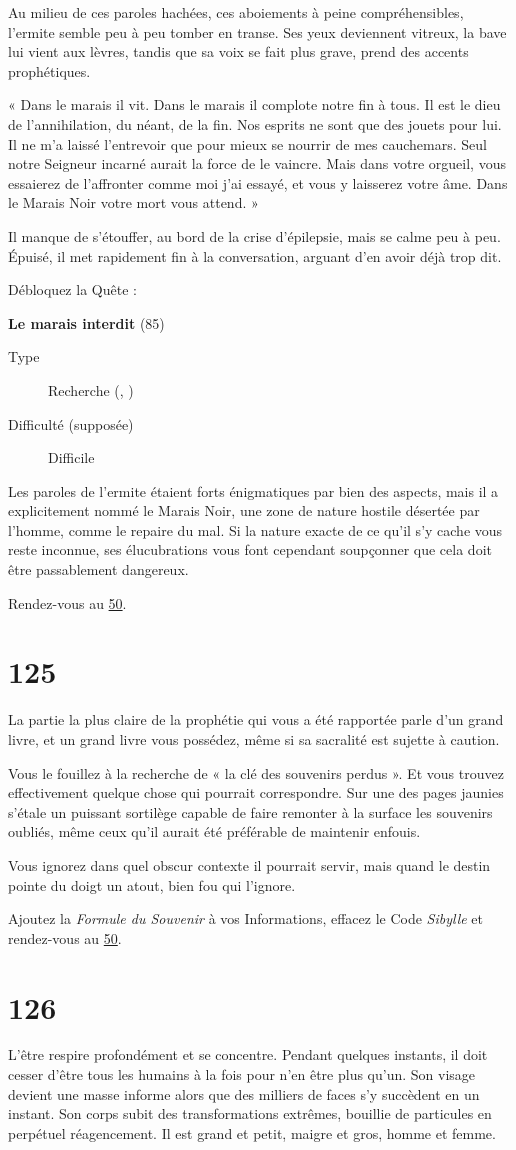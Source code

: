 \documentclass{report}
\newcommand{\gsection}[1]{
    \section{#1}
    \label{section-#1}
}
\newcommand{\glink}[1]{\hyperref[section-#1]{#1}}
\newcommand{\quest}[5]{
    \begin{mdframed}[innertopmargin=0.5cm,innerbottommargin=0.5cm,leftmargin=0.5cm,rightmargin=0.5cm]
        \begin{center}
            \textbf{#1} (#2)
        \end{center}
        \begin{description}
            \item[Type] #3
            \item[Difficulté (supposée)] #4
        \end{description}
        #5
    \end{mdframed}
}
\begin{document}
Au milieu de ces paroles hachées, ces aboiements à peine compréhensibles, l'ermite semble peu à peu tomber en transe. Ses yeux deviennent vitreux, la bave lui vient aux lèvres, tandis que sa voix se fait plus grave, prend des accents prophétiques.

« Dans le marais il vit. Dans le marais il complote notre fin à tous. Il est le dieu de l'annihilation, du néant, de la fin. Nos esprits ne sont que des jouets pour lui. Il ne m'a laissé l'entrevoir que pour mieux se nourrir de mes cauchemars. Seul notre Seigneur incarné aurait la force de le vaincre. Mais dans votre orgueil, vous essaierez de l'affronter comme moi j'ai essayé, et vous y laisserez votre âme. Dans le Marais Noir votre mort vous attend. »

Il manque de s'étouffer, au bord de la crise d'épilepsie, mais se calme peu à peu. Épuisé, il met rapidement fin à la conversation, arguant d'en avoir déjà trop dit.

Débloquez la Quête :

\quest{Le marais interdit}{85}{Recherche (\ankh, \caduceus)}{Difficile}{
Les paroles de l'ermite étaient forts énigmatiques par bien des aspects, mais il a explicitement nommé le Marais Noir, une zone de nature hostile désertée par l'homme, comme le repaire du mal. Si la nature exacte de ce qu'il s'y cache vous reste inconnue, ses élucubrations vous font cependant soupçonner que cela doit être passablement dangereux.
}

Rendez-vous au \glink{50}.

\gsection{125}

La partie la plus claire de la prophétie qui vous a été rapportée parle d'un grand livre, et un grand livre vous possédez, même si sa sacralité est sujette à caution.

Vous le fouillez à la recherche de « la clé des souvenirs perdus ». Et vous trouvez effectivement quelque chose qui pourrait correspondre. Sur une des pages jaunies s'étale un puissant sortilège capable de faire remonter à la surface les souvenirs oubliés, même ceux qu'il aurait été préférable de maintenir enfouis.

Vous ignorez dans quel obscur contexte il pourrait servir, mais quand le destin pointe du doigt un atout, bien fou qui l'ignore.

Ajoutez la \emph{Formule du Souvenir} à vos Informations, effacez le Code \emph{Sibylle} et rendez-vous au \glink{50}.

\gsection{126}

L'être respire profondément et se concentre. Pendant quelques instants, il doit cesser d'être tous les humains à la fois pour n'en être plus qu'un. Son visage devient une masse informe alors que des milliers de faces s'y succèdent en un instant. Son corps subit des transformations extrêmes, bouillie de particules en perpétuel réagencement. Il est grand et petit, maigre et gros, homme et femme.
\end{document}
